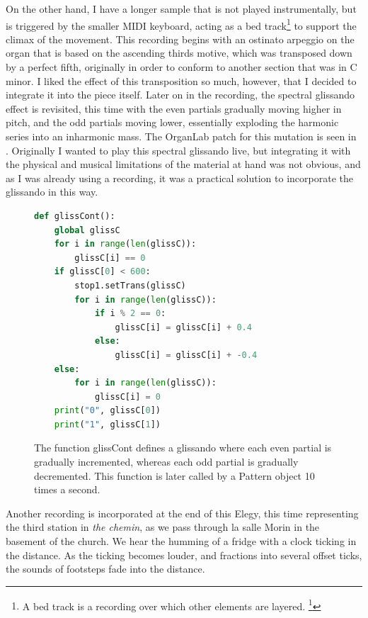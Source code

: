 \documentclass[12pt,twoside,maitrise]{dms_ks}
\theoremstyle{definition}
\begin{document}
{On the other hand, I have a longer sample that is not played instrumentally, but is triggered by the smaller MIDI keyboard, acting as a bed track\footnote{A bed track is a recording over which other elements are layered. \footcite{attariwala_re-imagining_2021}} to support the climax of the movement. 
This recording begins with an ostinato arpeggio on the organ that is based on the ascending thirds motive, which was transposed down by a perfect fifth, originally in order to conform to another section that was in C minor. 
I liked the effect of this transposition so much, however, that I decided to integrate it into the piece itself. 
Later on in the recording, the spectral glissando effect is revisited, this time with the even partials gradually moving higher in pitch, and the odd partials moving lower, essentially exploding the harmonic series into an inharmonic mass. 
The OrganLab patch for this mutation is seen in .
Originally I wanted to play this spectral glissando live, but integrating it with the physical and musical limitations of the material at hand was not obvious, and as I was already using a recording, it was a practical solution to incorporate the glissando in this way.

\begin{figure}[H]
\begin{lstlisting}[language=Python]
def glissCont():
    global glissC
    for i in range(len(glissC)):
        glissC[i] == 0
    if glissC[0] < 600:
        stop1.setTrans(glissC)
        for i in range(len(glissC)):
            if i % 2 == 0:
                glissC[i] = glissC[i] + 0.4
            else:
                glissC[i] = glissC[i] + -0.4
    else:
        for i in range(len(glissC)):
            glissC[i] = 0
    print("0", glissC[0])
    print("1", glissC[1])
\end{lstlisting}
\caption{The function glissCont defines a glissando where each even partial is gradually incremented, whereas each odd partial is gradually decremented. This function is later called by a Pattern object 10 times a second.}
\label{fig:glisscont}
\end{figure}

Another recording is incorporated at the end of this Elegy, this time representing the third station in \textit{the chemin}, as we pass through la salle Morin in the basement of the church. We hear the humming of a fridge with a clock ticking in the distance. As the ticking becomes louder, and fractions into several offset ticks, the sounds of footsteps fade into the distance.

}
\end{document}
